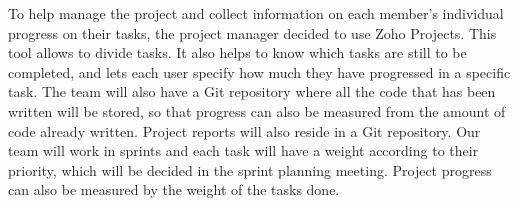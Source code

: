 
To help manage the project and collect information on each member's individual progress on their tasks, the project manager decided to use Zoho Projects. This tool allows to divide tasks. It also helps to know which tasks are still to be completed, and lets each user specify how much they have progressed in a specific task. The team will also have a Git repository where all the code that has been written will be stored, so that progress can also be measured from the amount of code already written. Project reports will also reside in a Git repository. Our team will work in sprints and each task will have a weight according to their priority, which will be decided in the sprint planning meeting. Project progress can also be measured by the weight of the tasks done.
